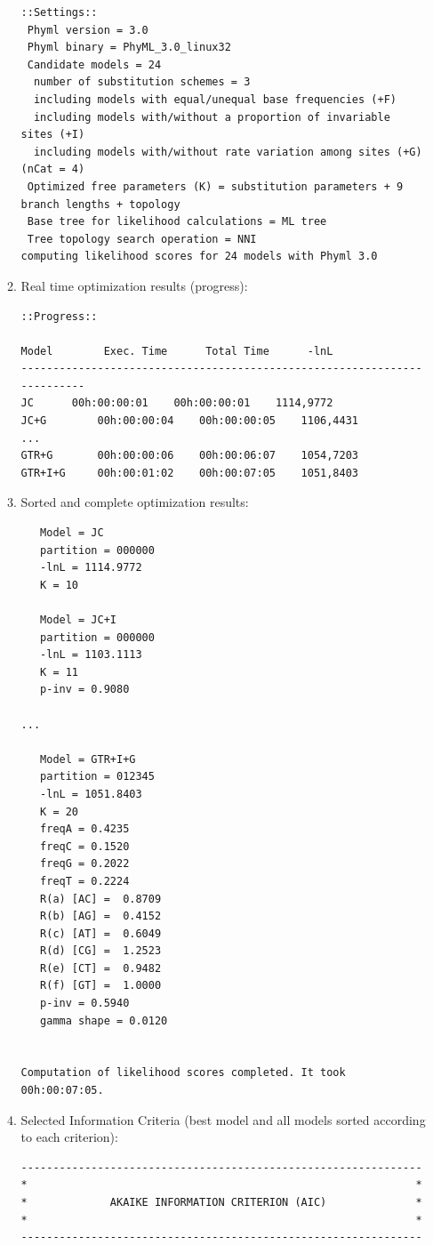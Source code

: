 \begin{enumerate}
\begin{enumerate}
\begin{lstlisting}
::Settings::
 Phyml version = 3.0
 Phyml binary = PhyML_3.0_linux32
 Candidate models = 24
  number of substitution schemes = 3
  including models with equal/unequal base frequencies (+F)
  including models with/without a proportion of invariable sites (+I)
  including models with/without rate variation among sites (+G) (nCat = 4)
 Optimized free parameters (K) = substitution parameters + 9 branch lengths + topology 
 Base tree for likelihood calculations = ML tree
 Tree topology search operation = NNI
computing likelihood scores for 24 models with Phyml 3.0
\end{lstlisting}

\item Real time optimization results (progress):

\begin{lstlisting}
::Progress::

Model 		 Exec. Time 	 Total Time 	 -lnL
-------------------------------------------------------------------------
JC		00h:00:00:01	00h:00:00:01	1114,9772
JC+G		00h:00:00:04	00h:00:00:05	1106,4431
...
GTR+G		00h:00:00:06	00h:00:06:07	1054,7203
GTR+I+G		00h:00:01:02	00h:00:07:05	1051,8403
\end{lstlisting}

\item Sorted and complete optimization results:

\begin{lstlisting}
   Model = JC
   partition = 000000
   -lnL = 1114.9772
   K = 10 
 
   Model = JC+I
   partition = 000000
   -lnL = 1103.1113
   K = 11
   p-inv = 0.9080 

...

   Model = GTR+I+G
   partition = 012345
   -lnL = 1051.8403
   K = 20
   freqA = 0.4235 
   freqC = 0.1520 
   freqG = 0.2022 
   freqT = 0.2224 
   R(a) [AC] =  0.8709
   R(b) [AG] =  0.4152
   R(c) [AT] =  0.6049
   R(d) [CG] =  1.2523
   R(e) [CT] =  0.9482
   R(f) [GT] =  1.0000
   p-inv = 0.5940
   gamma shape = 0.0120 
 
 
Computation of likelihood scores completed. It took 00h:00:07:05.
\end{lstlisting}

\item Selected Information Criteria (best model and all models sorted according to each criterion):

\begin{lstlisting}
---------------------------------------------------------------
*                                                             *
*             AKAIKE INFORMATION CRITERION (AIC)              *
*                                                             *
---------------------------------------------------------------
 

\end{lstlisting}
\end{enumerate}
\end{enumerate}
